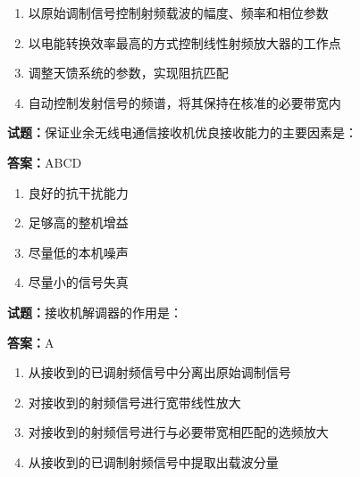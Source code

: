 \documentclass{ctexbook}
\begin{document}
\begin{enumerate}[leftmargin=3em]
  \item 以原始调制信号控制射频载波的幅度、频率和相位参数 

  \item 以电能转换效率最高的方式控制线性射频放大器的工作点 

  \item 调整天馈系统的参数，实现阻抗匹配 

  \item 自动控制发射信号的频谱，将其保持在核准的必要带宽内 

\end{enumerate}





\vspace{1em}

\textbf{试题：}保证业余无线电通信接收机优良接收能力的主要因素是： 

\textbf{答案：}ABCD 

\begin{enumerate}[leftmargin=3em]
  \item 良好的抗干扰能力 

  \item 足够高的整机增益 

  \item 尽量低的本机噪声 

  \item 尽量小的信号失真 

\end{enumerate}





\vspace{1em}

\textbf{试题：}接收机解调器的作用是： 

\textbf{答案：}A 

\begin{enumerate}[leftmargin=3em]
  \item 从接收到的已调射频信号中分离出原始调制信号 

  \item 对接收到的射频信号进行宽带线性放大 

  \item 对接收到的射频信号进行与必要带宽相匹配的选频放大 

  \item 从接收到的已调制射频信号中提取出载波分量 

\end{enumerate}
\end{document}
